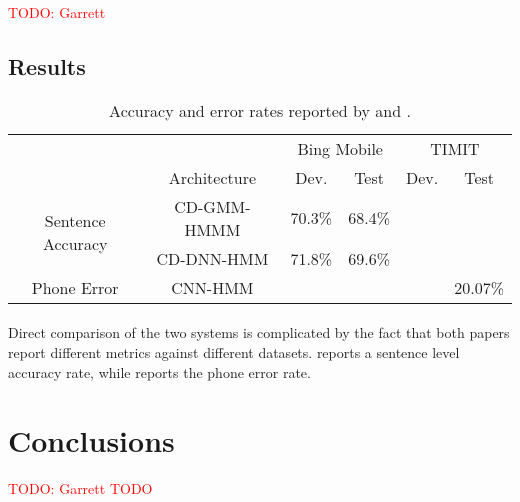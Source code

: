 \documentclass[letterpaper]{article}
\newcommand{\TODO}[1]{\textcolor{red}{TODO: #1}}
\begin{document}
\TODO{Garrett}

\subsection*{Results}

\begin{table}[H]
	\centering
	\begin{tabular}{c|c|c|c|c|c}
		& & \multicolumn{2}{c|}{Bing Mobile} & \multicolumn{2}{c}{TIMIT}\\
		& Architecture & Dev. & Test  & Dev. & Test \\
		\hline
		\multirow{2}{*}{Sentence Accuracy} & CD-GMM-HMMM & 70.3\% & 68.4\% & & \\
		& CD-DNN-HMM & 71.8\% & 69.6\% & & \\
		\hline
		Phone Error & CNN-HMM  & & &  & 20.07\%
	\end{tabular}
	\caption{Accuracy and error rates reported by \cite{DBLP:journals/taslp/DahlYDA12} and \cite{DBLP:journals/taslp/Abdel-HamidMJDPY14}.}
	\label{tbl:results}
\end{table}

\paragraph{} Direct comparison of the two systems is complicated by the fact that both papers report different metrics against different datasets. \cite{DBLP:journals/taslp/DahlYDA12} reports a sentence level accuracy rate, while \cite{DBLP:journals/taslp/Abdel-HamidMJDPY14} reports the phone error rate.


\section*{Conclusions} \TODO{Garrett TODO}

\appendix

\singlespacing



\end{document}

